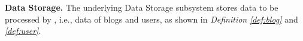 \textbf{Data Storage.} The underlying Data Storage subsystem stores data to be processed by \sys{}, i.e., data of blogs and users, as shown in \textit{Definition} \textit{\ref{def:blog}} and \textit{\ref{def:user}}.

